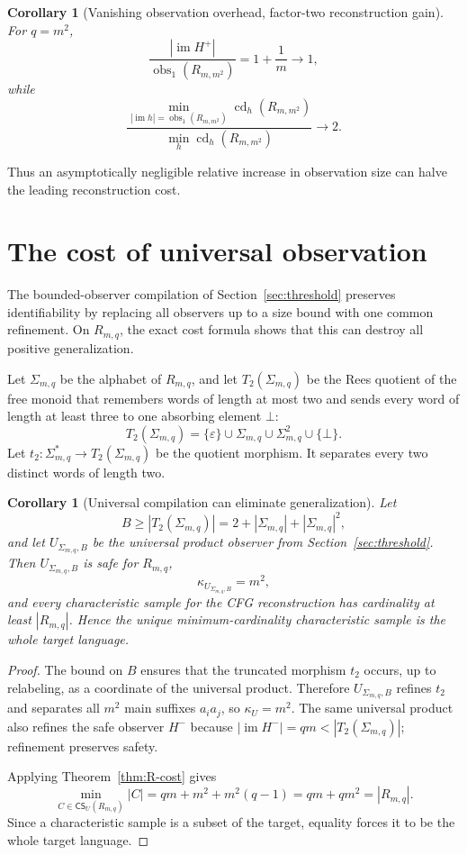 \documentclass[11pt]{article}
\newtheorem{corollary}[theorem]{Corollary}
\theoremstyle{definition}
\theoremstyle{remark}
\newcommand{\eps}{\varepsilon}
\newcommand{\im}{\operatorname{im}}
\newcommand{\obs}{\operatorname{obs}}
\newcommand{\cd}{\operatorname{cd}}
\newcommand{\CS}{\mathsf{CS}}
\begin{document}
\begin{corollary}[Vanishing observation overhead, factor-two reconstruction gain]
\label{cor:R-asymptotic}
For \(q=m^2\),
\[
 \frac{|\im H^+|}{\obs_1(R_{m,m^2})}
 =1+\frac1m\longrightarrow1,
\]
while
\[
 \frac{
 \min_{|\im h|=\obs_1(R_{m,m^2})}\cd_h(R_{m,m^2})
 }{
 \min_h\cd_h(R_{m,m^2})
 }
 \longrightarrow2.
\]
\end{corollary}

Thus an asymptotically negligible relative increase in observation size can
halve the leading reconstruction cost.

\section{The cost of universal observation}
\label{sec:universal-penalty}

The bounded-observer compilation of Section~\ref{sec:threshold} preserves
identifiability by replacing all observers up to a size bound with one common
refinement.  On \(R_{m,q}\), the exact cost formula shows that this can
destroy all positive generalization.

Let \(\Sigma_{m,q}\) be the alphabet of \(R_{m,q}\), and let
\(T_2(\Sigma_{m,q})\) be the Rees quotient of the free monoid that remembers
words of length at most two and sends every word of length at least three to
one absorbing element \(\bot\):
\[
 T_2(\Sigma_{m,q})=\{\eps\}\cup\Sigma_{m,q}\cup\Sigma_{m,q}^2
 \cup\{\bot\}.
\]
Let \(t_2:\Sigma_{m,q}^*\to T_2(\Sigma_{m,q})\) be the quotient morphism.
It separates every two distinct words of length two.

\begin{corollary}[Universal compilation can eliminate generalization]
\label{cor:universal-penalty}
Let
\[
 B\ge |T_2(\Sigma_{m,q})|
 =2+|\Sigma_{m,q}|+|\Sigma_{m,q}|^2,
\]
and let \(U_{\Sigma_{m,q},B}\) be the universal product observer from
Section~\ref{sec:threshold}.  Then \(U_{\Sigma_{m,q},B}\) is safe for
\(R_{m,q}\),
\[
 \kappa_{U_{\Sigma_{m,q},B}}=m^2,
\]
and every characteristic sample for the CFG reconstruction has cardinality at
least \(|R_{m,q}|\).  Hence the unique minimum-cardinality characteristic
sample is the whole target language.
\end{corollary}

\begin{proof}
The bound on \(B\) ensures that the truncated morphism \(t_2\) occurs, up
to relabeling, as a coordinate of the universal product.  Therefore
\(U_{\Sigma_{m,q},B}\) refines \(t_2\) and separates all \(m^2\) main
suffixes \(a_i a_j\), so \(\kappa_U=m^2\).  The same universal product
also refines the safe observer \(H^-\) because
\(|\im H^-|=qm<|T_2(\Sigma_{m,q})|\); refinement preserves safety.

Applying Theorem~\ref{thm:R-cost} gives
\[
 \min_{C\in\CS_U(R_{m,q})}|C|
 =qm+m^2+m^2(q-1)
 =qm+qm^2
 =|R_{m,q}|.
\]
Since a characteristic sample is a subset of the target, equality forces it
to be the whole target language.
\end{proof}
\end{document}
